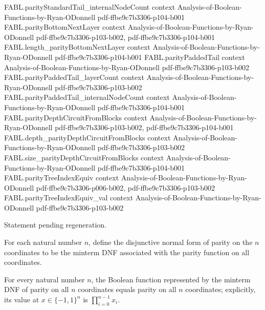 \begin{theorem}
\proofstep
  {FABL.parityStandardTail_internalNodeCount}
  {context}
  {Analysis-of-Boolean-Functions-by-Ryan-ODonnell}
  {pdf-ffbe9c7b3306-p104-b001}
\proofstep
  {FABL.parityBottomNextLayer}
  {context}
  {Analysis-of-Boolean-Functions-by-Ryan-ODonnell}
  {pdf-ffbe9c7b3306-p103-b002,
    pdf-ffbe9c7b3306-p104-b001}
\proofstep
  {FABL.length_parityBottomNextLayer}
  {context}
  {Analysis-of-Boolean-Functions-by-Ryan-ODonnell}
  {pdf-ffbe9c7b3306-p104-b001}
\proofstep
  {FABL.parityPaddedTail}
  {context}
  {Analysis-of-Boolean-Functions-by-Ryan-ODonnell}
  {pdf-ffbe9c7b3306-p103-b002}
\proofstep
  {FABL.parityPaddedTail_layerCount}
  {context}
  {Analysis-of-Boolean-Functions-by-Ryan-ODonnell}
  {pdf-ffbe9c7b3306-p103-b002}
\proofstep
  {FABL.parityPaddedTail_internalNodeCount}
  {context}
  {Analysis-of-Boolean-Functions-by-Ryan-ODonnell}
  {pdf-ffbe9c7b3306-p104-b001}
\proofstep
  {FABL.parityDepthCircuitFromBlocks}
  {context}
  {Analysis-of-Boolean-Functions-by-Ryan-ODonnell}
  {pdf-ffbe9c7b3306-p103-b002,
    pdf-ffbe9c7b3306-p104-b001}
\proofstep
  {FABL.depth_parityDepthCircuitFromBlocks}
  {context}
  {Analysis-of-Boolean-Functions-by-Ryan-ODonnell}
  {pdf-ffbe9c7b3306-p103-b002}
\proofstep
  {FABL.size_parityDepthCircuitFromBlocks}
  {context}
  {Analysis-of-Boolean-Functions-by-Ryan-ODonnell}
  {pdf-ffbe9c7b3306-p104-b001}
\proofstep
  {FABL.parityTreeIndexEquiv}
  {context}
  {Analysis-of-Boolean-Functions-by-Ryan-ODonnell}
  {pdf-ffbe9c7b3306-p006-b002,
    pdf-ffbe9c7b3306-p103-b002}
\proofstep
  {FABL.parityTreeIndexEquiv_val}
  {context}
  {Analysis-of-Boolean-Functions-by-Ryan-ODonnell}
  {pdf-ffbe9c7b3306-p103-b002}

Statement pending regeneration.
\end{theorem}

\begin{definition}
\label{FABL.parityDNF}
\leanok
{}
For each natural number $n$, define the disjunctive normal form of parity on the $n$
coordinates to be the minterm DNF associated with the parity function on all
coordinates.
\end{definition}

\begin{theorem}
\label{FABL.parityDNF_toBooleanFunction}
\leanok
{}
For every natural number $n$, the Boolean function represented by the minterm DNF of
parity on all $n$ coordinates equals parity on all $n$ coordinates; explicitly, its
value at $x\in\{-1,1\}^n$ is $\prod_{i=0}^{n-1}x_i$.
\end{theorem}

